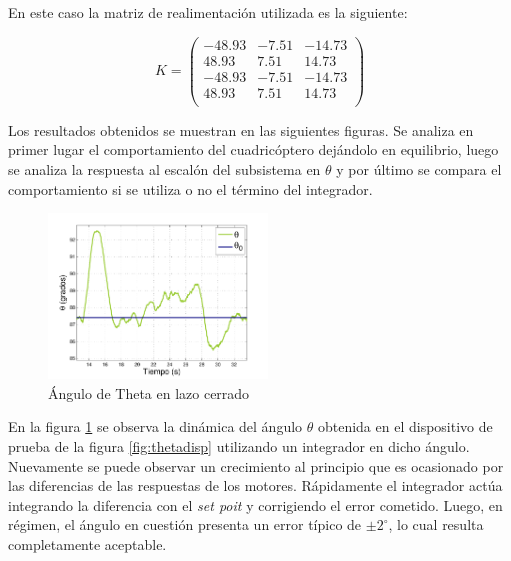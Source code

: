 \documentclass[main]{subfiles}
\begin{document}
En este caso la matriz de realimentación utilizada es la siguiente:

\begin{equation}
\label{K_theta}
K = \left( \begin{array}{ccc}
-48.93 & -7.51 & -14.73\\
 48.93 &  7.51 &  14.73\\
-48.93 & -7.51 & -14.73\\
 48.93 &  7.51 &  14.73\\
\end{array}\right)
\end{equation}
\vspace{10pt}

Los resultados obtenidos se  muestran en las siguientes figuras. Se analiza en primer lugar el comportamiento del cuadricóptero dejándolo en equilibrio, luego se analiza la respuesta al escalón del subsistema en $\theta$ y por último se compara el comportamiento si se utiliza o no el término del integrador.

\begin{figure}
	\vspace{-20pt}
	\centering
	\includegraphics[width=0.52\textwidth]{./pics_test_control/theta.pdf}
	\caption{\'Angulo de Theta en lazo cerrado}
	\label{fig:theta}
\end{figure}

En la figura \ref{fig:theta} se observa la dinámica del ángulo $\theta$ obtenida en el dispositivo de prueba de la figura \ref{fig:thetadisp} utilizando un integrador en dicho ángulo. Nuevamente se puede observar un crecimiento al principio que es ocasionado por las diferencias de las respuestas de los motores. Rápidamente el integrador actúa integrando la diferencia con el \emph{set poit} y corrigiendo el error cometido. Luego, en régimen, el ángulo en cuestión presenta un error típico de $\pm 2^\circ$, lo cual resulta completamente aceptable.\\
\end{document}

